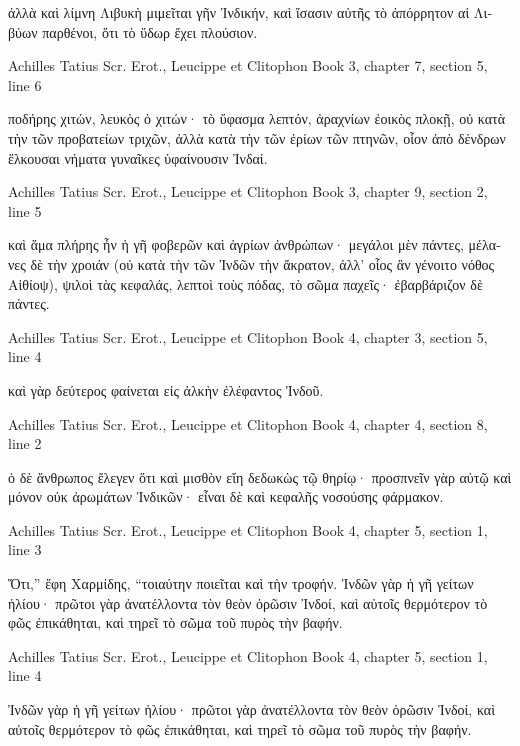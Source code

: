 \documentclass[12pt,letterpaper,twoside,final]{memoir}
\begin{document}
\begin{greek}
   ἀλλὰ καὶ λίμνη Λιβυκὴ μιμεῖται γῆν Ἰνδικήν, 
καὶ ἴσασιν αὐτῆς τὸ ἀπόρρητον αἱ Λιβύων παρθένοι, ὅτι τὸ ὕδωρ 
ἔχει πλούσιον. 



Achilles Tatius Scr. Erot., Leucippe et Clitophon 
Book 3, chapter 7, section 5, line 6

                                 ποδήρης χιτών, λευκὸς ὁ χιτών· τὸ 
ὕφασμα λεπτόν, ἀραχνίων ἐοικὸς πλοκῇ, οὐ κατὰ τὴν τῶν προβατείων 
τριχῶν, ἀλλὰ κατὰ τὴν τῶν ἐρίων τῶν πτηνῶν, οἷον ἀπὸ δένδρων 
ἕλκουσαι νήματα γυναῖκες ὑφαίνουσιν Ἰνδαί. 



Achilles Tatius Scr. Erot., Leucippe et Clitophon 
Book 3, chapter 9, section 2, line 5

                                         καὶ ἅμα πλήρης ἦν ἡ γῆ 
φοβερῶν καὶ ἀγρίων ἀνθρώπων· μεγάλοι μὲν πάντες, μέλανες δὲ τὴν   
χροιάν (οὐ κατὰ τὴν τῶν Ἰνδῶν τὴν ἄκρατον, ἀλλ' οἷος ἂν γένοιτο 
νόθος Αἰθίοψ), ψιλοὶ τὰς κεφαλάς, λεπτοὶ τοὺς πόδας, τὸ σῶμα 
παχεῖς· ἐβαρβάριζον δὲ πάντες. 



Achilles Tatius Scr. Erot., Leucippe et Clitophon 
Book 4, chapter 3, section 5, line 4

                                                                        καὶ γὰρ 
δεύτερος φαίνεται εἰς ἀλκὴν ἐλέφαντος Ἰνδοῦ. 



Achilles Tatius Scr. Erot., Leucippe et Clitophon 
Book 4, chapter 4, section 8, line 2

ὁ δὲ ἄνθρωπος ἔλεγεν ὅτι καὶ μισθὸν εἴη δεδωκὼς τῷ θηρίῳ· 
προσπνεῖν γὰρ αὐτῷ καὶ μόνον οὐκ ἀρωμάτων Ἰνδικῶν· εἶναι δὲ 
καὶ κεφαλῆς νοσούσης φάρμακον. 



Achilles Tatius Scr. Erot., Leucippe et Clitophon 
Book 4, chapter 5, section 1, line 3

                 Ὅτι,” ἔφη Χαρμίδης, “τοιαύτην ποιεῖται καὶ τὴν 
τροφήν. Ἰνδῶν γὰρ ἡ γῆ γείτων ἡλίου· πρῶτοι γὰρ ἀνατέλλοντα 
τὸν θεὸν ὁρῶσιν Ἰνδοί, καὶ αὐτοῖς θερμότερον τὸ φῶς ἐπικάθηται, 
καὶ τηρεῖ τὸ σῶμα τοῦ πυρὸς τὴν βαφήν. 



Achilles Tatius Scr. Erot., Leucippe et Clitophon 
Book 4, chapter 5, section 1, line 4

         Ἰνδῶν γὰρ ἡ γῆ γείτων ἡλίου· πρῶτοι γὰρ ἀνατέλλοντα 
τὸν θεὸν ὁρῶσιν Ἰνδοί, καὶ αὐτοῖς θερμότερον τὸ φῶς ἐπικάθηται, 
καὶ τηρεῖ τὸ σῶμα τοῦ πυρὸς τὴν βαφήν. 




\end{greek}
\end{document}
